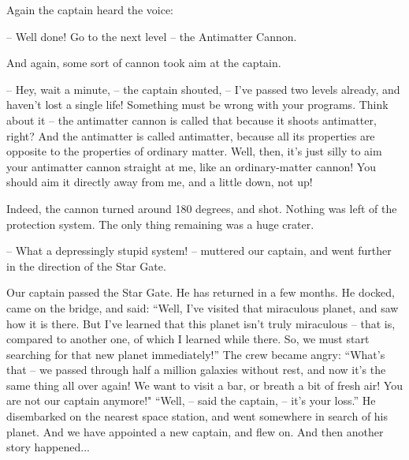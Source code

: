 \documentclass[ebook,twoside,final,openright]{memoir}
\begin{document}
\par
Again the captain heard the voice:\par
– Well done! Go to the next level – the Antimatter Cannon.\par
And again, some sort of cannon took aim at the captain.\par
– Hey, wait a minute, – the captain shouted, – I’ve passed two levels already, and haven’t lost a single life! Something must be wrong with your programs. Think about it – the antimatter cannon is called that because it shoots antimatter, right? And the antimatter is called antimatter, because all its properties are opposite to the properties of ordinary matter. Well, then, it’s just silly to aim your antimatter cannon straight at me, like an ordinary-matter cannon! You should aim it directly away from me, and a little down, not up!\par
\par
Indeed, the cannon turned around 180 degrees, and shot. Nothing was left of the protection system. The only thing remaining was a huge crater.\par
– What a depressingly stupid system! – muttered our captain, and went further in the direction of the Star Gate.\par
\par
Our captain passed the Star Gate. He has returned in a few months. He docked, came on the bridge, and said: “Well, I’ve visited that miraculous planet, and saw how it is there. But I’ve learned that this planet isn’t truly miraculous – that is, compared to another one, of which I learned while there. So, we must start searching for that new planet immediately!” The crew became angry: “What’s that – we passed through half a million galaxies without rest, and now it’s the same thing all over again! We want to visit a bar, or breath a bit of fresh air! You are not our captain anymore!" “Well, – said the captain, – it’s your loss.” He disembarked on the nearest space station, and went somewhere in search of his planet. And we have appointed a new captain, and flew on. And then another story happened...
\end{document}
